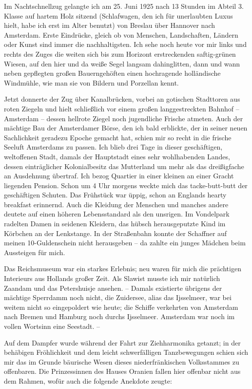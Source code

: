 \documentclass[a5paper,pagesize,10pt,twoside=true]{scrbook}
\begin{document}
Im Nachtschnellzug gelangte ich am 25. Juni 1925 nach 13 Stunden im Abteil 3. Klasse auf hartem Holz sitzend (Schlafwagen, den ich für unerlaubten Luxus hielt, habe ich erst im Alter benutzt) von Breslau über Hannover nach Amsterdam. Erste Eindrücke, gleich ob von Menschen, Landschaften, Ländern oder Kunst sind immer die nachhaltigsten. Ich sehe noch heute vor mir links und rechts des Zuges die weiten sich bis zum Horizont erstreckenden saftig-grünen Wiesen, auf den hier und da weiße Segel langsam dahinglitten, dann und wann neben gepflegten großen Bauerngehöften einen hochragende holländische Windmühle, wie man sie von Bildern und Porzellan kennt.

Jetzt donnerte der Zug über Kanalbrücken, vorbei an gotischen Stadttoren aus roten Ziegeln und hielt schließlich vor einem großen langgestreckten Bahnhof -- Amsterdam -- dessen hellrote Ziegel noch jugendliche Frische atmeten. Auch der mächtige Bau der Amsterdamer Börse, den ich bald erblickte, der in seiner neuen Sachlichkeit geradezu Epoche gemacht hat, schien mir so recht in die frische Seeluft Amsterdams zu passen. Ich blieb drei Tage in dieser geschäftigen, weltoffenen Stadt, damals der Hauptstadt eines sehr wohlhabenden Landes, dessen einträglicher Kolonialbesitz das Mutterland um mehr als das dreißigfache an Ausdehnung übertraf. Ich bezog Quartier in einer kleinen an einer Gracht liegenden Pension. Schon um 4 Uhr morgens weckte mich das tacke-butt-butt der geschäftigen Schuten. Das Frühstück war üppig, schon an Englands hearty breakfast erinnernd. Auch die Kleidung der Menschen und manches andere deutete auf einen höheren Lebensstandard als den unsrigen. Im Vondelpark radelten Damen in seidenen Kleidern, das hübsch herausgeputzte Kind im Körbchen an der Lenkstange. In der Straßenbahn konnte der Schaffner auf meinen 10-Guldenschein nicht herausgeben -- da zahlte ein junges Mädchen beim Aussteigen für mich.

Das Reichsmuseum war ein starkes Erlebnis; neu waren für mich die prächtigen Interieurs aus Hollands großer Zeit. Als Slawist musste ich mir natürlich Zaandam und das Petershuisje ansehen. -- Damals existierte übrigens der mächtige Sperrdamm noch nicht, die Zuidersee, alias das Ijsselmeer, war bei weitem nicht so eingepoldert wie heute; die Schiffe verkehrten von Amsterdam nach Bremen und Hamburg noch durchs Ijsselmeer. Amsterdam war noch im vollen Wortsinn eine Seestadt. --

Auf dem Dampfer wurde während der Fahrt zur Ziehharmonika getanzt; in der behäbigen Fröhlichkeit und dem leicht schwerfälligen Tanzbewegungen schien sich mir das im Grunde bäurische Wesen dieses niederfränkischen Volksstammes zu offenbaren. Die Prinzessinnen des Hauses Oranien fallen hier offenbar nicht aus dem Rahmen, wofür auch die folgende Anekdote zeugte:
\end{document}

